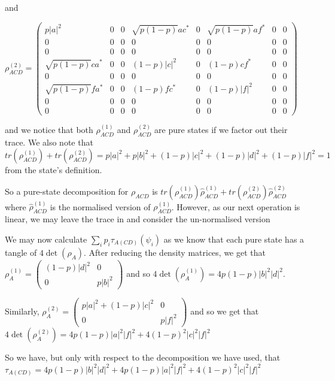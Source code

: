 \documentclass[12pt,a4paper]{article}
\numberwithin{equation}{section}
\begin{document}
\vskip 2mm

\noindent and

\vskip 2mm

$\rho_{ACD}^{(2)} = \begin{pmatrix} p|a|^2 & 0 & 0 & \sqrt{p(1-p)}ac^* & 0 & \sqrt{p(1-p)}af^* & 0 & 0 \\ 0 & 0 & 0 & 0 & 0 & 0 & 0 & 0 \\ 0 & 0 & 0 & 0 & 0 & 0 & 0 & 0 \\ \sqrt{p(1-p)}ca^* & 0 & 0 & (1-p)|c|^2 & 0 & (1-p)cf^* & 0 & 0 \\ 0 & 0 & 0 & 0 & 0 & 0 & 0 & 0 \\ \sqrt{p(1-p)}fa^* & 0 & 0 & (1-p)fc^* & 0 & (1-p)|f|^2 & 0 & 0 \\ 0 & 0 & 0 & 0 & 0 & 0 & 0 & 0 \\ 0 & 0 & 0 & 0 & 0 & 0 & 0 & 0 \end{pmatrix}$

\vskip 2mm

\noindent and we notice that both $\rho_{ACD}^{(1)}$ and $\rho_{ACD}^{(2)}$ are pure states if we factor out their trace. We also note that $tr(\rho_{ACD}^{(1)}) + tr(\rho_{ACD}^{(2)}) = p|a|^2 + p|b|^2 + (1-p)|c|^2 + (1-p)|d|^2 + (1-p)|f|^2 = 1$ from the state's definition.

So a pure-state decomposition for $\rho_{ACD}$ is $tr(\rho_{ACD}^{(1)})\hat{\rho}_{ACD}^{(1)} + tr(\rho_{ACD}^{(2)})\hat{\rho}_{ACD}^{(2)}$ where $\hat{\rho}_{ACD}^{(1)}$ is the normalised version of $\rho_{ACD}^{(1)}$. However, as our next operation is linear, we may leave the trace in and consider the un-normalised version

We may now calculate $\sum_{i}p_{i}\tau_{A(CD)}(\psi_{i})$ as we know that each pure state has a tangle of $4\det(\rho_{A})$. After reducing the density matrices, we get that $\rho_{A}^{(1)} = \begin{pmatrix} (1-p)|d|^2 & 0 \\ 0 & p|b|^2 \end{pmatrix}$ and so $4\det(\rho_{A}^{(1)}) = 4p(1-p)|b|^2|d|^2$.

Similarly, $\rho_{A}^{(2)} = \begin{pmatrix} p|a|^2 + (1-p)|c|^2 & 0 \\ 0 & p|f|^2 \end{pmatrix}$ and so we get that $4\det(\rho_{A}^{(2)}) = 4p(1-p)|a|^2|f|^2 + 4(1-p)^2|c|^2|f|^2$

So we have, but only with respect to the decomposition we have used, that $\tau_{A(CD)} = 4p(1-p)|b|^2|d|^2 + 4p(1-p)|a|^2|f|^2 + 4(1-p)^2|c|^2|f|^2$
\end{document}
